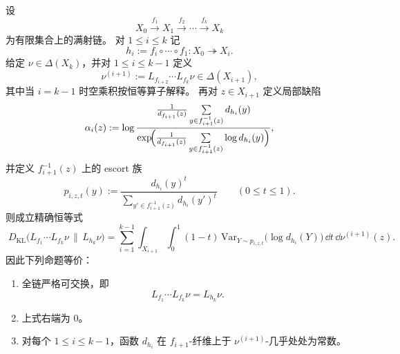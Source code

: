 \begin{theorem}\label{thm:pom-bc-chain-defect-equals-escort-curvature-sum}
设
\[
X_0\xrightarrow{f_1}X_1\xrightarrow{f_2}\cdots\xrightarrow{f_k}X_k
\]
为有限集合上的满射链。
对 \(1\le i\le k\) 记
\[
h_i:=f_i\circ\cdots\circ f_1:X_0\twoheadrightarrow X_i.
\]
给定 \(\nu\in\Delta(X_k)\)，并对 \(1\le i\le k-1\) 定义
\[
\nu^{(i+1)}:=L_{f_{i+2}}\cdots L_{f_k}\nu\in\Delta(X_{i+1}),
\]
其中当 \(i=k-1\) 时空乘积按恒等算子解释。
再对 \(z\in X_{i+1}\) 定义局部缺陷
\[
\alpha_i(z)
:=
\log\frac{
\frac1{d_{f_{i+1}}(z)}
\sum\limits_{y\in f_{i+1}^{-1}(z)} d_{h_i}(y)
}{
\exp\!\Bigl(
\frac1{d_{f_{i+1}}(z)}
\sum\limits_{y\in f_{i+1}^{-1}(z)} \log d_{h_i}(y)
\Bigr)
},
\]
并定义 \(f_{i+1}^{-1}(z)\) 上的 escort 族
\[
p_{i,z,t}(y)
:=
\frac{d_{h_i}(y)^t}
{\sum\limits_{y'\in f_{i+1}^{-1}(z)}d_{h_i}(y')^t}
\qquad
(0\le t\le 1).
\]
则成立精确恒等式
\[
\boxed{\;
D_{\mathrm{KL}}\!\bigl(L_{f_1}\cdots L_{f_k}\nu\,\|\,L_{h_k}\nu\bigr)
=
\sum_{i=1}^{k-1}
\int_{X_{i+1}}
\int_0^1
(1-t)\,
\mathrm{Var}_{Y\sim p_{i,z,t}}\!\bigl(\log d_{h_i}(Y)\bigr)\,
\dd t\,
\dd \nu^{(i+1)}(z).
\;}
\]
因此下列命题等价：
\begin{enumerate}
  \item 全链严格可交换，即
  \[
  L_{f_1}\cdots L_{f_k}\nu=L_{h_k}\nu.
  \]
  \item 上式右端为 \(0\)。
  \item 对每个 \(1\le i\le k-1\)，函数 \(d_{h_i}\) 在 \(f_{i+1}\)-纤维上于
\(\nu^{(i+1)}\)-几乎处处为常数。
\end{enumerate}
\end{theorem}

